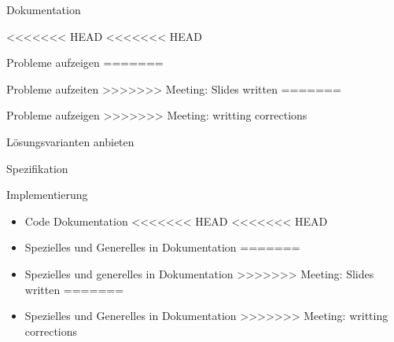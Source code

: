 \begin{frame}[t]{Dokumentation}
  \begin{bigitemize}[<+->]{3mm}
<<<<<<< HEAD
<<<<<<< HEAD
		\item Probleme aufzeigen
=======
		\item Probleme aufzeiten
>>>>>>> Meeting: Slides written
=======
		\item Probleme aufzeigen
>>>>>>> Meeting: writting corrections
		\item Lösungsvarianten anbieten
		\item Spezifikation
		\item Implementierung
		\begin{itemize}
			\item Code Dokumentation
<<<<<<< HEAD
<<<<<<< HEAD
			\item Spezielles und Generelles in Dokumentation
=======
			\item Spezielles und generelles in Dokumentation
>>>>>>> Meeting: Slides written
=======
			\item Spezielles und Generelles in Dokumentation
>>>>>>> Meeting: writting corrections
		\end{itemize}
	\end{bigitemize}
\end{frame}
